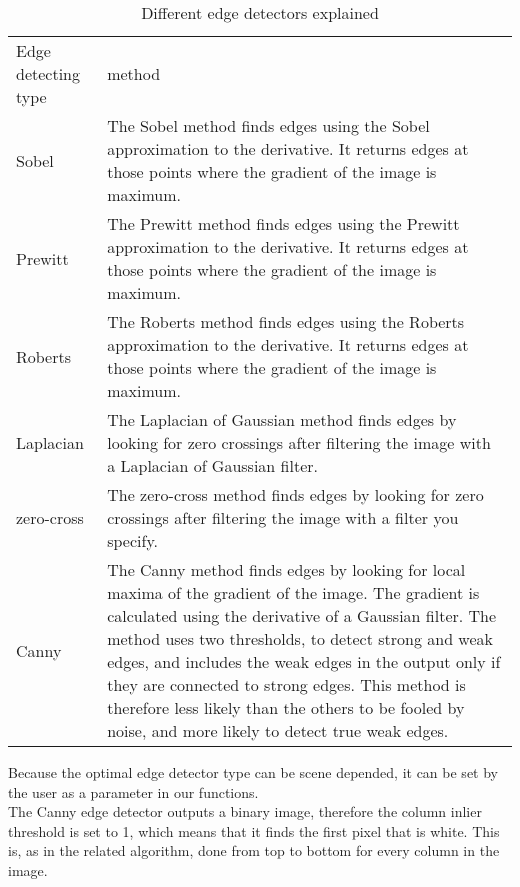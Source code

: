 \begin{table}[ht]
\label{tableedge}
\caption{Different edge detectors explained}
\begin{tabular}{|l|p{10cm}|}
	\hline
	Edge detecting type		& method\\
	Sobel					& The Sobel method finds edges using the Sobel
	approximation to the derivative. It returns edges at those points where the
	gradient of the image is maximum.\\
	\hline
	Prewitt					& The Prewitt method finds edges using the Prewitt
	approximation to the derivative. It returns edges at those points where the
	gradient of the image is maximum.\\
	\hline
	Roberts					& The Roberts method finds edges using the Roberts
	approximation to the derivative. It returns edges at those points where the
	gradient of the image is maximum.\\
	\hline
	Laplacian				& The Laplacian of Gaussian method finds edges by
	looking for zero crossings after filtering the image with a Laplacian of Gaussian
	filter.\\
	\hline
	zero-cross				& The zero-cross method finds edges by looking for zero
	crossings after filtering the image with a filter you specify.\\
	\hline
	Canny					& The Canny method finds edges by looking for local
	maxima of the gradient of the image. The gradient is calculated using the derivative of
	a Gaussian filter. The method uses two thresholds, to detect strong and weak
	edges, and includes the weak edges in the output only if they are connected to
	strong edges. This method is therefore less likely than the others to be fooled
	by noise, and more likely to detect true weak edges.\\
	\hline
\end{tabular}
\end{table}

Because the optimal edge detector type can be scene depended, it can be set
by the user as a parameter in our functions.\\

The Canny edge detector outputs a binary image, therefore the column inlier
threshold is set to 1, which means that it finds the first pixel that is white. 
This is, as in the related algorithm, done from top to bottom for every column in
the image.\\

